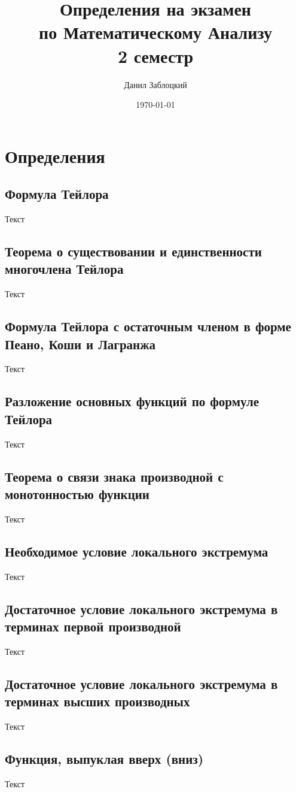 \documentclass{report}
\title{Определения на экзамен \\ по Математическому Анализу \\ 2 семестр}
\author{Данил Заблоцкий}
\date{\today}
\theoremstyle{definition}
\begin{document}
\maketitle
\tableofcontents
\chapter*{Определения}

\section{Формула Тейлора}
Текст

\section{Теорема о существовании и единственности многочлена Тейлора}
Текст

\section{Формула Тейлора с остаточным членом в форме Пеано, Коши и Лагранжа}
Текст

\section{Разложение основных функций по формуле Тейлора}
Текст

\section{Теорема о связи знака производной с монотонностью функции}
Текст

\section{Необходимое условие локального экстремума}
Текст

\section{Достаточное условие локального экстремума в терминах первой производной}
Текст

\section{Достаточное условие локального экстремума в терминах высших производных}
Текст

\section{Функция, выпуклая вверх (вниз)}
Текст
\end{document}
